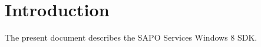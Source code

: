 \chapter{Introduction}
\label{sec:chapter1}
The present document describes the SAPO Services Windows 8 SDK.

